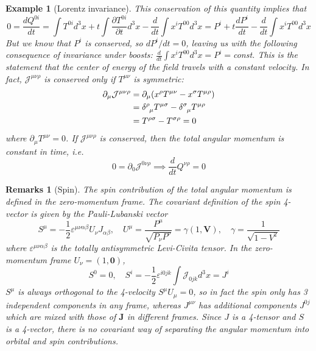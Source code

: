 \documentclass[a4paper]{article}
\newtheorem{remarks}{Remarks}[section]
\newtheorem{eg}{Example}[section]
\theoremstyle{new}
\begin{document}
\begin{eg}[Lorentz invariance]
This conservation of this quantity implies that
$$0=\frac{dQ^{0i}}{dt}=\int T^{0i}d^3x+t\int\frac{\partial T^{0i}}{\partial t}d^3x-\frac{d}{dt}\int x^iT^{00}d^3x=P^i+t\frac{dP^i}{dt}-\frac{d}{dt}\int x^iT^{00}d^3x$$
But we know that $P^i$ is conserved, so $dP^i/dt = 0$, leaving us with the following consequence of invariance under boosts: $\frac{d}{dt}\int x^iT^{00}d^3x=P^i=$const. This is the statement that the center of energy of the field travels with a constant velocity. In fact, $\mathcal{J}^{\mu\nu\rho}$ is conserved only if $T^{\mu\nu}$ is symmetric:
\begin{align}
    \partial_\mu\mathcal{J}^{\mu\nu\rho}&=\partial_\mu(x^\rho T^{\mu\nu}-x^\sigma T^{\mu\rho})\nonumber\\&=\tensor*{\delta}{*_{}^{\rho}_{\mu}}T^{\mu\sigma}-\tensor*{\delta}{*_{}^{\sigma}_{\mu}}T^{\mu\rho}\nonumber\\&=T^{\rho\sigma}-T^{\sigma\rho}=0\nonumber
\end{align}
where $\partial_\mu T^{\mu\nu}=0$. If $\mathcal{J}^{\mu\nu\rho}$ is conserved, then the total angular momentum is constant in time, i.e.
$$0=\partial_0\mathcal{J}^{0\nu\rho}\implies\frac{d}{dt}Q^{\nu\rho}=0$$
\end{eg}
\begin{remarks}[Spin]
The spin contribution of the total angular momentum is defined in the zero-momentum frame. The covariant definition of the spin 4-vector is given by the Pauli-Lubanski vector
$$S^\mu=-\frac{1}{2}\varepsilon^{\mu\nu\alpha\beta}U_\nu J_{\alpha\beta},\quad U^\mu=\frac{P^\mu}{\sqrt{P_\nu P^\nu}}=\gamma(1,\mathbf{V}),\quad\gamma=\frac{1}{\sqrt{1-V^2}}$$
where $\varepsilon^{\mu\nu\alpha\beta}$ is the totally antisymmetric Levi-Civita tensor. In the zero-momentum frame $U_\nu=(1,\boldsymbol{0})$, 
$$S^0=0,\quad S^i=-\frac{1}{2}\varepsilon^{i0jk}\int\mathcal{J}_{0jk}d^3x=J^i$$
$S^\mu$ is always orthogonal to the 4-velocity $S^\mu U_\mu=0$, so in fact the spin only has 3 independent components in any frame, whereas $J^{\mu\nu}$ has additional components $J^{0j}$ which are mixed with those of $\mathbf{J}$ in different frames. Since $J$ is a 4-tensor and $S$ is a 4-vector, there is no covariant way of separating the angular momentum into orbital and spin contributions.
\end{remarks}
\newpage
\end{document}
